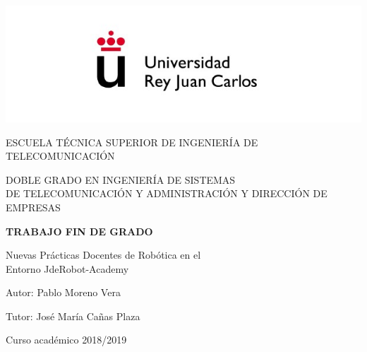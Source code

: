 \begin{titlepage}
	\begin{center}
		\vspace*{3mm}
		\begin{center}
			\includegraphics[width=0.8\linewidth]{figures/logo.jpg}
		\end{center}
		\vspace{6.5mm}
		
		\fontsize{15.5}{14}\selectfont ESCUELA TÉCNICA SUPERIOR DE INGENIERÍA DE TELECOMUNICACIÓN
		\vspace{13mm}
		
		\fontsize{14}{14}\selectfont DOBLE GRADO EN INGENIERÍA DE SISTEMAS \\ DE TELECOMUNICACIÓN Y ADMINISTRACIÓN Y DIRECCIÓN DE EMPRESAS
		
		\vspace{55pt}
		
		\fontsize{15.7}{14}\selectfont \textbf{TRABAJO FIN DE GRADO} 
		
		\vspace{15mm}
		\begin{huge}
			Nuevas Prácticas Docentes de Robótica en el \\ \vspace{0.4cm} Entorno JdeRobot-Academy
		\end{huge}
		
		\vspace{15mm}
		
		\begin{large}
			Autor: Pablo Moreno Vera
			
			Tutor: José María Cañas Plaza
			
			\vspace{10mm}
		\end{large}
		\begin{normalsize}
			Curso académico 2018/2019		
		\end{normalsize}
		\vspace{10mm}
		
	\end{center}
	
\end{titlepage}